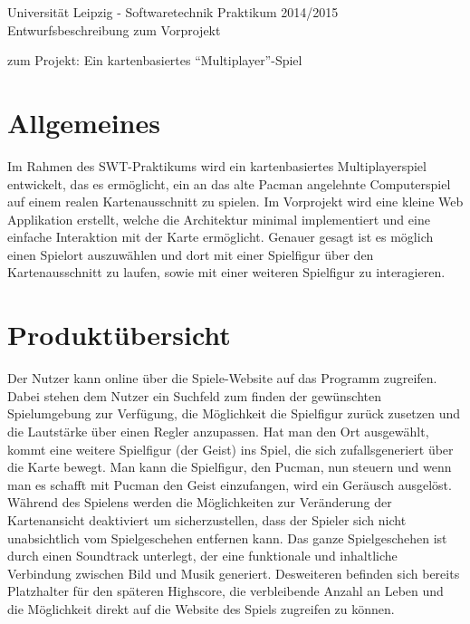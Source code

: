 \documentclass[11pt,a4paper]{article}
\begin{document}
\center \large Universität Leipzig - Softwaretechnik Praktikum 2014/2015\\
\center \Huge Entwurfsbeschreibung zum Vorprojekt \\
\par\bigskip

\small zum Projekt: Ein kartenbasiertes “Multiplayer”-Spiel

\par\bigskip

\tableofcontents

\clearpage

\flushleft
\section{Allgemeines}
Im Rahmen des SWT-Praktikums wird ein kartenbasiertes Multiplayerspiel entwickelt, das es ermöglicht, ein an das alte Pacman angelehnte Computerspiel auf einem realen Kartenausschnitt zu spielen.
Im Vorprojekt wird eine kleine Web Applikation erstellt, welche die Architektur minimal implementiert und eine einfache Interaktion mit der Karte ermöglicht.
Genauer gesagt ist es möglich einen Spielort auszuwählen und dort mit einer Spielfigur über den Kartenausschnitt zu laufen, sowie mit einer weiteren Spielfigur zu interagieren.

\section{Produktübersicht}
Der Nutzer kann online über die Spiele-Website auf das Programm zugreifen.
Dabei stehen dem Nutzer ein Suchfeld zum finden der gewünschten Spielumgebung zur Verfügung, die Möglichkeit die Spielfigur zurück zusetzen und die Lautstärke über einen Regler anzupassen.
Hat man den Ort ausgewählt, kommt eine weitere Spielfigur (der Geist) ins Spiel, die sich zufallsgeneriert über die Karte bewegt.
Man kann die Spielfigur, den Pucman, nun steuern und wenn man es schafft mit Pucman den Geist einzufangen, wird ein Geräusch ausgelöst.
Während des Spielens werden die Möglichkeiten zur Veränderung der Kartenansicht deaktiviert um sicherzustellen, dass der Spieler sich nicht unabsichtlich vom Spielgeschehen entfernen kann.
Das ganze Spielgeschehen ist durch einen Soundtrack unterlegt, der eine  funktionale und inhaltliche Verbindung zwischen Bild und Musik  generiert.
Desweiteren befinden sich bereits Platzhalter für den späteren Highscore, die verbleibende Anzahl an Leben und die Möglichkeit direkt auf die Website des Spiels zugreifen zu können.
\clearpage
\end{document}
